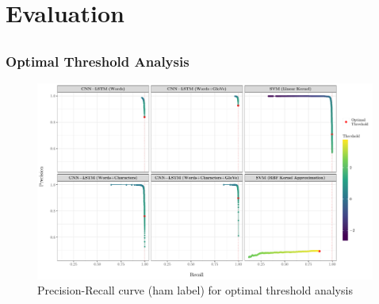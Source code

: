 \documentclass{beamer}
\begin{document}
\section{Evaluation}
\subsection{}
\begin{framefont}{\footnotesize}
	\begin{frame}
		\frametitle{Optimal Threshold Analysis}
		\centering
		\begin{figure}
			\captionsetup{justification=centering}
			\includegraphics[trim={0cm 0cm 0.2cm 0cm},clip,width=11.2cm]{combined.pdf}
			\caption{Precision-Recall curve (ham label) for optimal threshold analysis}
		\end{figure}
	\end{frame}
\end{framefont}
\end{document}
